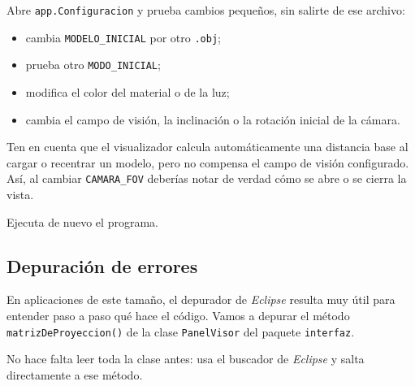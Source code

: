 \documentclass[
  spanish,
  11pt,
  a4paper,
  DIV=11,
  numbers=noendperiod]{scrartcl}
\providecommand{\tightlist}{%
  \setlength{\itemsep}{0pt}\setlength{\parskip}{0pt}}
\begin{document}
\begin{tcolorbox}[enhanced jigsaw, colframe=quarto-callout-note-color-frame, arc=.35mm, bottomrule=.15mm, left=2mm, breakable, opacityback=0, coltitle=black, bottomtitle=1mm, toptitle=1mm, titlerule=0mm, toprule=.15mm, rightrule=.15mm, title={Personaliza el arranque}, colbacktitle=quarto-callout-note-color!10!white, opacitybacktitle=0.6, colback=white, leftrule=.75mm]

Abre \texttt{app.Configuracion} y prueba cambios pequeños, sin salirte de ese archivo:

\begin{itemize}
\tightlist
\item
  cambia \texttt{MODELO\_INICIAL} por otro \texttt{.obj};
\item
  prueba otro \texttt{MODO\_INICIAL};
\item
  modifica el color del material o de la luz;
\item
  cambia el campo de visión, la inclinación o la rotación inicial de la cámara.
\end{itemize}

Ten en cuenta que el visualizador calcula automáticamente una distancia base al cargar o recentrar un modelo, pero no compensa el campo de visión configurado. Así, al cambiar \texttt{CAMARA\_FOV} deberías notar de verdad cómo se abre o se cierra la vista.

Ejecuta de nuevo el programa.

\end{tcolorbox}

\subsection{Depuración de errores}

\label{depuración-de-errores}

En aplicaciones de este tamaño, el depurador de \emph{Eclipse} resulta muy útil para entender paso a paso qué hace el código. Vamos a depurar el método \texttt{matrizDeProyeccion()} de la clase \texttt{PanelVisor} del paquete \texttt{interfaz}.

No hace falta leer toda la clase antes: usa el buscador de \emph{Eclipse} y salta directamente a ese método.
\end{document}
